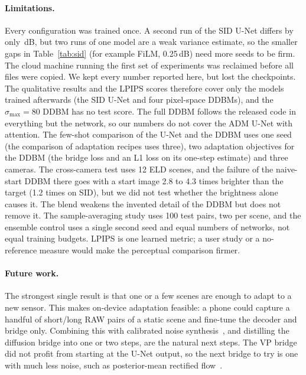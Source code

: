 \paragraph{Limitations.} Every configuration was trained once. A second run of the SID U-Net differs by only \SIDSEEDGAP\,dB, but two runs of one model are a weak variance estimate, so the smaller gaps in Table~\ref{tab:sid} (for example FiLM, 0.25\,dB) need more seeds to be firm. The cloud machine running the first set of experiments was reclaimed before all files were copied. We kept every number reported here, but lost the checkpoints. The qualitative results and the LPIPS scores therefore cover only the models trained afterwards (the SID U-Net and four pixel-space DDBMs), and the $\sigma_{\max}=80$ DDBM has no test score. The full DDBM follows the released code in everything but the network, so our numbers do not cover the ADM U-Net with attention. The few-shot comparison of the U-Net and the DDBM uses one seed (the comparison of adaptation recipes uses three), two adaptation objectives for the DDBM (the bridge loss and an L1 loss on its one-step estimate) and three cameras. The cross-camera test uses 12 ELD scenes, and the failure of the naive-start DDBM there goes with a start image 2.8 to 4.3 times brighter than the target (1.2 times on SID), but we did not test whether the brightness alone causes it. The blend weakens the invented detail of the DDBM but does not remove it. The sample-averaging study uses 100 test pairs, two per scene, and the ensemble control uses a single second seed and equal numbers of networks, not equal training budgets. LPIPS is one learned metric; a user study or a no-reference measure would make the perceptual comparison firmer.

\paragraph{Future work.} The strongest single result is that one or a few scenes are enough to adapt to a new sensor. This makes on-device adaptation feasible: a phone could capture a handful of short/long RAW pairs of a static scene and fine-tune the decoder and bridge only. Combining this with calibrated noise synthesis~\cite{wei2020eld}, and distilling the diffusion bridge into one or two steps, are the natural next steps. The VP bridge did not profit from starting at the U-Net output, so the next bridge to try is one with much less noise, such as posterior-mean rectified flow~\cite{ohayon2025pmrf}.
